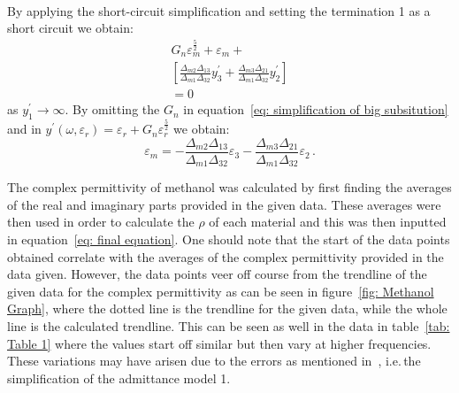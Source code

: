 \documentclass[12pt, a4paper]{article}
\begin{document}
\begin{multicols*}{2}
\begin{multline}
\end{multline}
By applying the short-circuit simplification and setting the termination 1 as a short circuit we obtain:
\begin{multline}
    G_n \varepsilon_m^{\frac{5}{2}} + \varepsilon_m +\\ \left[\frac{\Delta_{m2}\Delta_{13}}{\Delta_{m1}\Delta_{32}} y^{\prime}_3 + \frac{\Delta_{m3}\Delta_{21}}{\Delta_{m1}\Delta_{32}} y^{\prime}_2\right]\\ = 0 \, \label{eq: simplification of big subsitution}
\end{multline}
as \(y^{\prime}_1 \rightarrow \infty\). By omitting the \(G_n\) in equation~\ref{eq: simplification of big subsitution} and in \(y^{\prime}(\omega, \varepsilon_r) = \varepsilon_r + G_n \varepsilon_r^{\frac{5}{2}}\) we obtain:
\begin{equation}
    \varepsilon_m = - \frac{\Delta_{m2}\Delta_{13}}{\Delta_{m1}\Delta_{32}} \varepsilon_3 - \frac{\Delta_{m3}\Delta_{21}}{\Delta_{m1}\Delta_{32}} \varepsilon_2 \,. \label{eq: final equation}
\end{equation}

The complex permittivity of methanol was calculated by first finding the averages of the real and imaginary parts provided in the given data. These averages were then used in order to calculate the \(\rho\) of each material and this was then inputted in equation~\ref{eq: final equation}. One should note that the start of the data points obtained correlate with the averages of the complex permittivity provided in the data given. However, the data points veer off course from the trendline of the given data for the complex permittivity as can be seen in figure~\ref{fig: Methanol Graph}, where the dotted line is the trendline for the given data, while the whole line is the calculated trendline. This can be seen as well in the data in table~\ref{tab: Table 1} where the values start off similar but then vary at higher frequencies. These variations may have arisen due to the errors as mentioned in~\cite{marsland1987dielectric}, i.e.\,the simplification of the admittance model 1. 


\end{multicols*}
\end{document}
